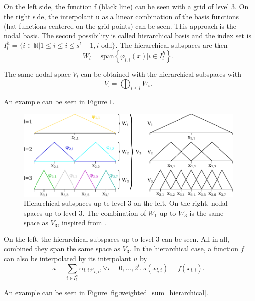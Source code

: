 On the left side, the function f (black line) can be seen with a grid of level 3. On the right side, the interpolant u as a linear combination of the basis functions (hat functions centered on the grid points) can be seen. This approach is the nodal basis. The second possibility is called hierarchical basis and the index set is $I_l^h = \{i \in \mathbb{N} | 1 \le i \le i \le s^l-1, i \text{ odd}\}$. The hierarchical subspaces are then 
\begin{equation}
	W_l = \text{span}\left\{ \varphi_{l,i}(x) | i \in I_l^h\right\}.
\end{equation}

The same nodal space $ V_l $ can be obtained with the hierarchical subspaces with 
\begin{equation}
	V_l = \bigoplus_{i \le l} W_i.
\end{equation}

An example can be seen in Figure \ref{fig:hierarchical_basis}.
\begin{figure}[H]
	\centering
	\includegraphics[width=\textwidth]{figures/Fig_2_6_hierarchical_subspaces}
	\caption{ Hierarchical subspaces up to level 3 on the left. On the right, nodal spaces up to level 3. The combination of $ W_1 $ up to $ W_3 $ is the same space as $ V_3 $, inspired from \cite{pfluger2010spatially}.}
	\label{fig:hierarchical_basis}
\end{figure}

On the left, the hierarchical subspaces up to level 3 can be seen. All in all, combined they span the same space as $ V_3 $. In the hierarchical case, a function $ f $ can also be interpolated by its interpolant $ u $ by 
\begin{equation}
	u = \sum_{i \in I_l^h}\alpha_{l,i} \varphi_{l,i}, \forall i = 0,...,2^l: u(x_{l,i}) = f(x_{l,i}).
\end{equation}

An example can be seen in Figure \ref{fig:weighted_sum_hierarchical}.

